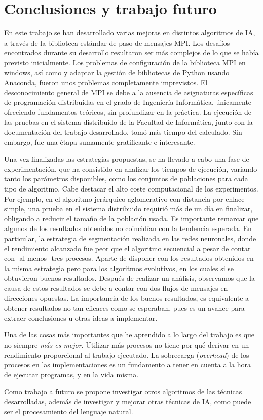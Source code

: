 \chapter{Conclusiones y trabajo futuro}
\label{cap:c5_conclu}

	En este trabajo se han desarrollado varias mejoras en distintos algoritmos de IA, a través de la biblioteca estándar de paso de mensajes MPI. Los desafíos encontrados durante su desarrollo resultaron ser más complejos de lo que se había previsto inicialmente. Los problemas de configuración de la biblioteca MPI en windows, así como y adaptar la gestión de bibliotecas de Python usando Anaconda, fueron unos problemas completamente imprevistos. El desconocimiento general de  MPI se debe a la ausencia de asignaturas específicas de programación distribuidas en el grado de Ingeniería Informática, únicamente ofreciendo fundamentos teóricos, sin profundizar en la práctica. La ejecución de las pruebas en el sistema distribuido de la Facultad de Informática, junto con la documentación del trabajo desarrollado, tomó más tiempo del calculado. Sin embargo, fue una étapa sumamente gratificante e interesante. 
	
		
	Una vez finalizadas las estrategias propuestas, se ha llevado a cabo una fase de experimentación, que ha consistido en analizar los tiempos de ejecución, variando tanto los parámetros disponibles, como los conjuntos de poblaciones para cada tipo de algoritmo. Cabe destacar el alto coste computacional de los experimentos. Por ejemplo, en el algoritmo jerárquico aglomerativo con distancia por enlace simple, una prueba en el sistema  distribuido requirió más de un día en finalizar, obligando a reducir el tamaño de la población usada. Es importante remarcar que algunos de los resultados obtenidos no coincidían con la tendencia esperada. En particular, la estrategia de segmentación realizada en las redes neuronales, donde el rendimiento alcanzado fue peor que el algoritmo secuencial a pesar de contar con -al menos- tres procesos. Aparte de disponer con los resultados obtenidos en la misma estrategia pero para los algoritmos evolutivos, en los cuales si se obtuvieron buenos resultados. Después de realizar un análisis, observamos que la causa de estos resultados se debe a contar con dos flujos de mensajes en direcciones opuestas. La importancia de los buenos resultados, es equivalente a obtener resultados no tan eficaces como se esperaban, pues es un avance para extraer conclusiones u otras ideas a implementar.
	

	Una de las cosas más importantes que he aprendido a lo largo del trabajo es que no siempre \textit{más es mejor}. Utilizar más procesos no tiene por qué derivar en un rendimiento proporcional al trabajo ejecutado. La sobrecarga (\textit{overhead}) de los procesos en las implementaciones es un fundamento a tener en cuenta a la hora de ejecutar programas, y en la vida misma.	
	
	
	Como trabajo a futuro se propone investigar otros algoritmos de las técnicas desarrolladas, además de investigar y mejorar otras técnicas de IA, como puede ser el procesamiento del lenguaje natural.
	
	
	
	
	